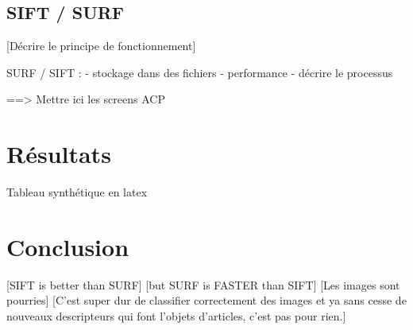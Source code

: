 \documentclass[12pt,a4paper,utf8x]{report}
\begin{document}
    \section{SIFT / SURF}
        [Décrire le principe de fonctionnement]

      SURF / SIFT :
      - stockage dans des fichiers
      - performance
      - décrire le processus

==> Mettre ici les screens ACP


\chapter{Résultats}

Tableau synthétique en latex


\chapter{Conclusion}
    [SIFT is better than SURF]
    [but SURF is FASTER than SIFT]
    [Les images sont pourries]
    [C'est super dur de classifier correctement des images et ya sans cesse de nouveaux descripteurs qui font l'objets d'articles, c'est pas pour rien.]

  
\end{document}

